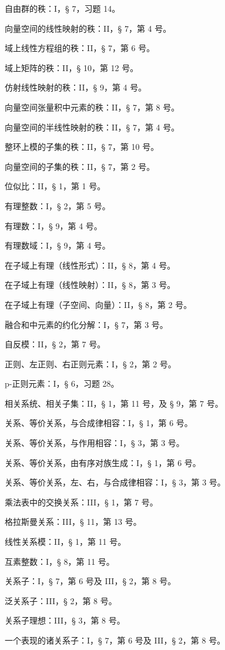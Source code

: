自由群的秩：I，§ 7，习题 14。

向量空间的线性映射的秩：II，§ 7，第 4 号。

域上线性方程组的秩：II，§ 7，第 6 号。

域上矩阵的秩：II，§ 10，第 12 号。

仿射线性映射的秩：II，§ 9，第 4 号。

向量空间张量积中元素的秩：II，§ 7，第 8 号。

向量空间的半线性映射的秩：II，§ 7，第 4 号。

整环上模的子集的秩：II，§ 7，第 10 号。

向量空间的子集的秩：II，§ 7，第 2 号。

位似比：II，§ 1，第 1 号。

有理整数：I，§ 2，第 5 号。

有理数：I，§ 9，第 4 号。

有理数域：I，§ 9，第 4 号。

在子域上有理（线性形式）：II，§ 8，第 4 号。

在子域上有理（线性映射）：II，§ 8，第 3 号。

在子域上有理（子空间、向量）：II，§ 8，第 2 号。

融合和中元素的约化分解：I，§ 7，第 3 号。

自反模：II，§ 2，第 7 号。

正则、左正则、右正则元素：I，§ 2，第 2 号。

p-正则元素：I，§ 6，习题 28。

相关系统、相关子集：II，§ 1，第 11 号，及 § 9，第 7 号。

关系、等价关系，与合成律相容：I，§ 1，第 6 号。

关系、等价关系，与作用相容：I，§ 3，第 3 号。

关系、等价关系，由有序对族生成：I，§ 1，第 6 号。

关系、等价关系，左、右，与合成律相容：I，§ 3，第 3 号。

乘法表中的交换关系：III，§ 1，第 7 号。

格拉斯曼关系：III，§ 11，第 13 号。

线性关系模：II，§ 1，第 11 号。

互素整数：I，§ 8，第 11 号。

关系子：I，§ 7，第 6 号及 III，§ 2，第 8 号。

泛关系子：III，§ 2，第 8 号。

关系子理想：III，§ 3，第 8 号。

一个表现的诸关系子：I，§ 7，第 6 号及 III，§ 2，第 8 号。

